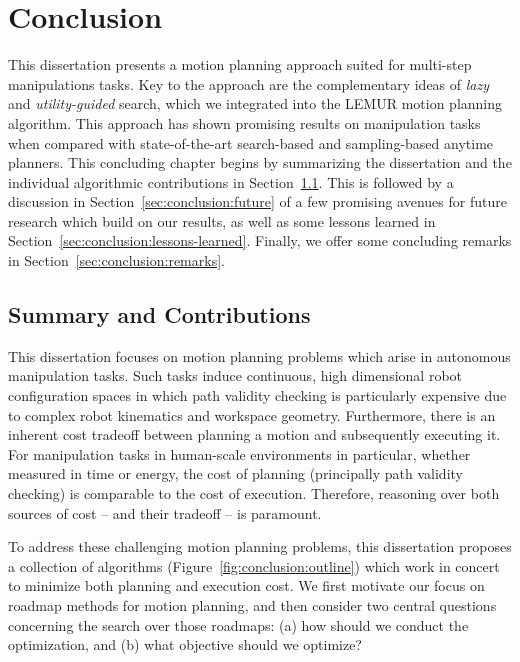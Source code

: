 \chapter{Conclusion}
\label{chap:conclusion}

This dissertation presents a motion planning approach suited for
multi-step manipulations tasks.
Key to the approach are the complementary ideas of \emph{lazy}
and \emph{utility-guided} search,
which we integrated into the LEMUR motion planning algorithm.
This approach has shown promising results on manipulation tasks
when compared with state-of-the-art
search-based and sampling-based anytime planners.
This concluding chapter begins by summarizing the dissertation
and the individual algorithmic contributions
in Section~\ref{sec:conclusion:summary}.
This is followed by a discussion in Section~\ref{sec:conclusion:future}
of a few promising avenues for future research
which build on our results,
as well as some lessons learned
in Section~\ref{sec:conclusion:lessons-learned}.
Finally, we offer some concluding remarks
in Section~\ref{sec:conclusion:remarks}.


\section{Summary and Contributions}
\label{sec:conclusion:summary}

This dissertation focuses on motion planning problems
which arise in autonomous manipulation tasks.
Such tasks induce continuous, high dimensional robot configuration
spaces
in which path validity checking is particularly expensive
due to complex robot kinematics and workspace geometry.
Furthermore,
there is an inherent cost tradeoff between
planning a motion and subsequently executing it.
For manipulation tasks in human-scale environments in particular,
whether measured in time or energy,
the cost of planning (principally path validity checking)
is comparable to the cost of execution.
Therefore,
reasoning over both sources of cost -- and their tradeoff --
is paramount.

To address these challenging motion planning problems,
this dissertation proposes a collection of algorithms
(Figure~\ref{fig:conclusion:outline})
which work in concert to minimize both planning and execution cost.
We first motivate our focus on roadmap methods for motion
planning,
and then consider two central questions concerning the search
over those roadmaps:
(a) how should we conduct the optimization,
and (b) what objective should we optimize?

